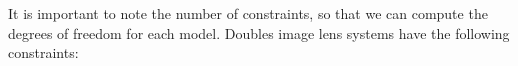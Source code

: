 It is important to note the number of constraints, so that we can compute the degrees of freedom for each model. Doubles image lens systems have the following constraints:
  